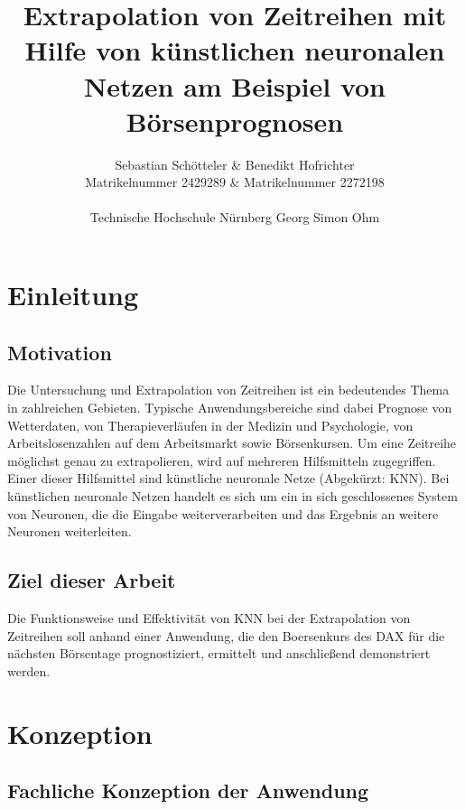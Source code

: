 \documentclass[11pt,a4paper]{scrreprt}
\begin{document}
\title
{
 {\bf Extrapolation von Zeitreihen mit Hilfe von künstlichen neuronalen Netzen am Beispiel von Börsenprognosen}
}

\author
{
	Sebastian Schötteler \& Benedikt Hofrichter \\
	Matrikelnummer 2429289 \& Matrikelnummer 2272198 \\\\ 
	Technische Hochschule Nürnberg Georg Simon Ohm \\
}


\maketitle

\tableofcontents

\chapter{Einleitung} %
	\section{Motivation}
Die Untersuchung  und Extrapolation von Zeitreihen ist ein bedeutendes Thema in zahlreichen Gebieten. Typische Anwendungsbereiche sind dabei Prognose von Wetterdaten, von Therapieverläufen in der  Medizin und Psychologie, von Arbeitslosenzahlen auf dem Arbeitsmarkt sowie Börsenkursen. Um eine Zeitreihe möglichst genau zu extrapolieren, wird auf mehreren Hilfsmitteln zugegriffen. Einer dieser Hilfsmittel sind künstliche neuronale Netze (Abgekürzt: KNN). Bei künstlichen neuronale Netzen handelt es sich um ein in sich geschlossenes System von Neuronen, die die Eingabe weiterverarbeiten und das Ergebnis an weitere Neuronen weiterleiten.  

	\section{Ziel dieser Arbeit}
Die Funktionsweise und Effektivität von KNN bei der Extrapolation von Zeitreihen soll anhand einer Anwendung, die den Boersenkurs des DAX für die nächsten Börsentage prognostiziert, ermittelt und anschließend demonstriert werden.

\chapter{Konzeption} %
	\section{Fachliche Konzeption der Anwendung} %
\end{document}
